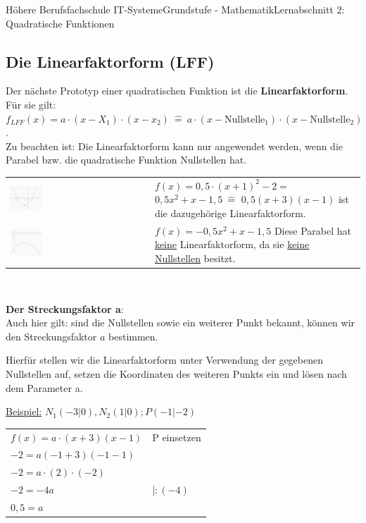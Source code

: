 \documentclass[11pt,twocolumn,oneside,openany,headings=optiontotoc,11pt,numbers=noenddot]{article}
\begin{document}
\begin{worksheet}{Höhere Berufsfachschule IT-Systeme}{Grundstufe - Mathematik}{Lernabschnitt 2: Quadratische Funktionen}
		\subsection*{Die Linearfaktorform (LFF)}
		Der nächste Prototyp einer quadratischen Funktion ist die \textbf{Linearfaktorform}. Für sie gilt: \(f_{LFF}(x) = a\cdot(x-X_1)\cdot(x-x_2)\ \hat{=}\ a\cdot(x-\text{Nullstelle}_1)\cdot(x-\text{Nullstelle}_2)\).\\
		Zu beachten ist: Die Linearfaktorform kann nur angewendet werden, wenn die Parabel bzw. die quadratische Funktion Nullstellen hat.\\
		\par\noindent
		\begin{tabularx}{0.5\textwidth}{XX}
			\includegraphics[width=0.23\textwidth,align=t]{../99_Bilder/LFF_Y.png} & \(f(x) = 0,5\cdot(x+1)^2 -2 =\) \(0,5x^2 +x -1,5\ \hat{=}\) \colorbox{green!10}{\(0,5(x+3)(x-1)\)} ist die dazugehörige Linearfaktorform.\\
			\includegraphics[width=0.23\textwidth,align=t]{../99_Bilder/LFF_N.png} & \(f(x) = -0,5x^2 +x -1,5\) Diese Parabel hat \underline{keine} Linearfaktorform, da sie \underline{keine Nullstellen} besitzt.\\
		\end{tabularx}\\
		\par\noindent
		\textbf{Der Streckungsfaktor a}:\\
		Auch hier gilt: sind die Nullstellen sowie ein weiterer Punkt bekannt, können wir den Streckungsfaktor \(a\) bestimmen.\\
		\par\noindent
		Hierfür stellen wir die Linearfaktorform unter Verwendung der gegebenen Nullstellen auf, setzen die Koordinaten des weiteren Punkts ein und lösen nach dem Parameter a.\\
		\par\noindent
		\underline{Beispiel:} \(N_1(-3|0), N_2(1|0); P(-1|-2)\)\\
		\begin{tabularx}{0.5\textwidth}{ll}
			\(f(x) = a\cdot(x+3)(x-1)\) & P einsetzen\\
			\(-2 = a(-1+3)(-1-1)\)\\
			\(-2 = a\cdot(2)\cdot(-2)\)\\
			\(-2 = -4a\) & |\(:(-4)\)\\
			\(0,5 = a\)
		\end{tabularx}

\end{worksheet}
\end{document}
